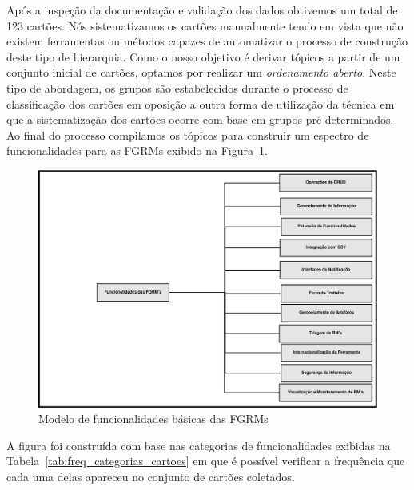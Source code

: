 Após a inspeção da documentação e validação dos dados obtivemos um total de 123
cartões. Nós sistematizamos os cartões manualmente tendo em vista que não
existem ferramentas ou métodos capazes de automatizar o processo de construção
deste tipo de hierarquia. Como o nosso objetivo é derivar tópicos a partir de um
conjunto inicial de cartões, optamos por realizar um \textit{ordenamento
    aberto}. Neste tipo de abordagem, os grupos são estabelecidos durante o
processo de classificação dos cartões em oposição a outra forma de utilização da
técnica em que a sistematização dos cartões ocorre com base em grupos
pré-determinados. Ao final do processo compilamos os tópicos para construir um
espectro de funcionalidades para as FGRMs exibido na
Figura~\ref{fig:diagrama-espectro-funcionalidades-fgrm}.

\begin{figure}[htpb]
	\centering
	\includegraphics[width=1.15\linewidth]{./chapter-estudo-funcionalidades-fgrm/img/diagrama-espectro-funcionalidades-fgrm.pdf}
	\caption{Modelo de funcionalidades básicas das FGRMs}
\label{fig:diagrama-espectro-funcionalidades-fgrm}
\end{figure}

A figura foi construída com base nas categorias de funcionalidades exibidas na
Tabela~\ref{tab:freq_categorias_cartoes} em que é possível verificar a
frequência que cada uma delas apareceu no conjunto de cartões coletados.

